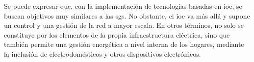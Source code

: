 \vspace{3mm}

Se puede expresar que, con la implementación de tecnologías basadas en \gls{ioe}, se buscan objetivos muy similares a las \gls{sg}s. No obstante, el \gls{ioe} va más allá y supone un control y una gestión de la red a mayor escala. En otros términos, no solo se constituye por los elementos de la propia infraestructura eléctrica, sino que también permite una gestión energética a nivel interna de los hogares, mediante la inclusión de electrodomésticos y otros dispositivos electrónicos.


